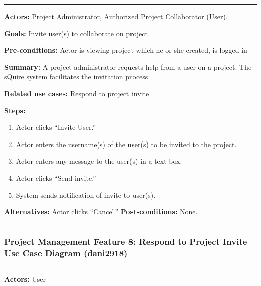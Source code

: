 \documentclass[twoside,letterpaper]{article}
\begin{document}
\vspace{2pt}
\hrule
\vspace{8pt}
\noindent \textbf{Actors:} Project Administrator, Authorized Project Collaborator (User).  \newline

\noindent \textbf{Goals:} Invite user(s) to collaborate on project \newline

\noindent  \textbf{Pre-conditions:} Actor is viewing project which he or she created, is logged in   \newline

\noindent \textbf{Summary:} A project administrator requests help from a user on a project. The sQuire system facilitates the invitation process  \newline

\noindent \textbf{Related use cases:} Respond to project invite\newline

\noindent \textbf{Steps:} \begin{enumerate}
  \item Actor clicks ``Invite User.''
  \item Actor enters the username(s) of the user(s) to be invited to the project.
  \item Actor enters any message to the user(s) in a text box.
  \item Actor clicks ``Send invite.''
  \item System sends notification of invite to user(s).
 \end{enumerate}
 
\noindent  \textbf{Alternatives:} Actor clicks ``Cancel.''
 \textbf{Post-conditions:} None.  \newline
 
\vspace{8pt}
\hrule
\newpage



\subsubsection[Project Management Feature 8: Respond to Project Invite Use Case Diagram (dani2918)]{\rmfamily\bfseries\color{black}
	Project Management Feature 8: Respond to Project Invite Use Case Diagram (dani2918)}
\hypertarget{RefHeading22059017292}{}
\bigskip

\vspace{2pt}
\hrule
\vspace{8pt}
\noindent \textbf{Actors:} User  \newline
\end{document}
